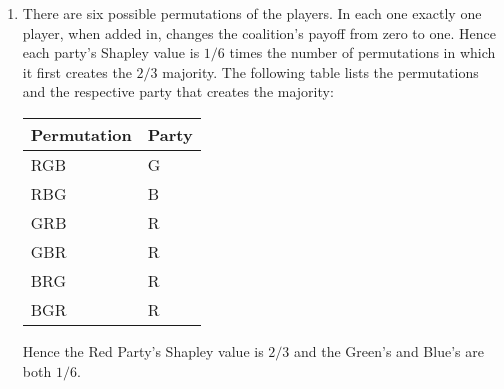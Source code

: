 \documentclass[11pt]{article} \usepackage{amssymb}
\begin{document}
\begin{enumerate}
\begin{enumerate}
\begin{enumerate}
    \item
      There are six possible permutations of the players. In each one
      exactly one player, when added in, changes the coalition's
      payoff from zero to one. Hence each party's Shapley value is
      $1/6$ times the number of permutations in which it first creates
      the $2/3$ majority. The following table lists the permutations
      and the respective party that creates the majority:
      \begin{table}
        \centering
        \begin{tabular}{l|l}
          Permutation & Party\\
          \hline
          RGB & G \\
          RBG & B \\
          GRB & R \\
          GBR & R \\
          BRG & R \\
          BGR & R
        \end{tabular}
      \end{table}
      Hence the Red Party's Shapley value is $2/3$ and the Green's and
      Blue's are both $1/6$.
    \end{enumerate}
    
  \end{enumerate}
\end{enumerate}
\end{document}
